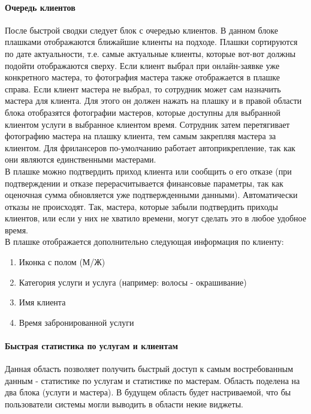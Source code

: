 \documentclass[DIV=calc, paper=a4, fontsize=11pt]{scrartcl} %
\begin{document}
\paragraph{Очередь клиентов} \label{paragraph:plashki}
После быстрой сводки следует блок с очередью клиентов. В данном блоке плашками отображаются ближайшие клиенты на подходе. Плашки сортируются по дате актуальности, т.е. самые актуальные клиенты, которые вот-вот должны подойти отображаются сверху. Если клиент выбрал при онлайн-заявке уже конкретного мастера, то фотография мастера также отображается в плашке справа. Если клиент мастера не выбрал, то сотрудник может сам назначить мастера для клиента. Для этого он должен нажать на плашку и в правой области блока отобразятся фотографии мастеров, которые доступны для выбранной клиентом услуги в выбранное клиентом время. Сотрудник затем перетягивает фотографию мастера на плашку клиента, тем самым закрепляя мастера за клиентом. Для фрилансеров по-умолчанию работает автоприкрепление, так как они являются единственными мастерами.
\\[0.5cm]
В плашке можно подтвердить приход клиента или сообщить о его отказе (при подтверждении и отказе перерасчитывается финансовые параметры, так как оценочная сумма обновляется уже подтвержденными данными). Автоматически отказы не происходят. Так, мастера, которые забыли подтвердить приходы клиентов, или если у них не хватило времени, могут сделать это в любое удобное время. 
\\[0.5cm]
В плашке отображается дополнительно следующая информация по клиенту:

    \begin{enumerate}
        \item Иконка с полом (М/Ж)
        \item Категория услуги и услуга (например: волосы - окрашивание)
        \item Имя клиента
        \item Время забронированной услуги
    \end{enumerate}
    
\paragraph{Быстрая статистика по услугам и клиентам}
Данная область позволяет получить быстрый доступ к самым востребованным данным - статистике по услугам и статистике по мастерам. Область поделена на два блока (услуги и мастера). В будущем область будет настриваемой, что бы пользователи системы могли выводить в области некие виджеты.
\end{document}
